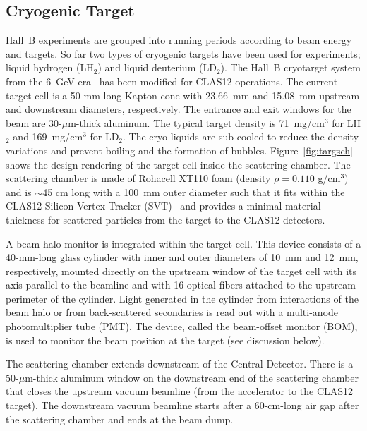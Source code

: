 \subsection{Cryogenic Target}
\label{sec-cryotgt}

Hall~B experiments are grouped into running periods according to beam energy and targets. So far two types of
cryogenic targets have been used for experiments; liquid hydrogen (LH$_2$) and liquid deuterium (LD$_2$). The
Hall~B cryotarget system from the 6~GeV era~\cite{CLAS} has been modified for CLAS12 operations. The
current target cell is a 50-mm long Kapton cone with 23.66~mm and 15.08~mm upstream and downstream
diameters, respectively. The entrance and exit windows for the beam are 30-$\mu$m-thick aluminum. The
typical target density is 71~mg/cm$^3$ for LH$_2$ and 169~mg/cm$^3$ for LD$_2$. The cryo-liquids are
sub-cooled to reduce the density variations and prevent boiling and the formation of bubbles.
Figure~\ref{fig:targsch} shows the design rendering of the target cell inside the scattering chamber. The
scattering chamber is made of Rohacell XT110 foam (density $\rho=0.110$ g/cm$^3$) and is $\sim$45 cm long
with a 100~mm outer diameter such that it fits within the CLAS12 Silicon Vertex Tracker (SVT)~\cite{svt-nim}
and provides a minimal material thickness for scattered particles from the target to the CLAS12 detectors.  

A beam halo monitor is integrated within the target cell. This device consists of a 40-mm-long glass cylinder with
inner and outer diameters of 10~mm and 12~mm, respectively, mounted directly on the upstream window of the
target cell with its axis parallel to the beamline and with 16 optical fibers attached to the upstream perimeter of
the cylinder. Light generated in the cylinder from interactions of the beam halo or from back-scattered secondaries
is read out with a multi-anode photomultiplier tube (PMT). The device, called the  beam-offset monitor (BOM), is
used to monitor the beam position at the target (see discussion below).  

The scattering chamber extends downstream of the Central Detector. There is a 50-$\mu$m-thick aluminum
window on the downstream end of the scattering chamber that closes the upstream vacuum beamline (from the
accelerator to the CLAS12 target). The downstream vacuum beamline starts after a 60-cm-long air gap after the
scattering chamber and ends at the beam dump.  

